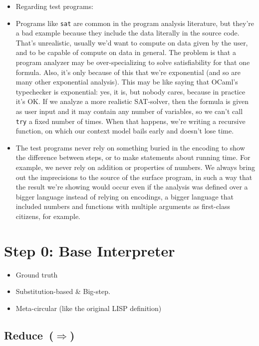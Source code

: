 \documentclass[12pt, oneside]{book}
\begin{document}
\begin{itemize}
  \item Regarding test programs:
  \item Programs like \texttt{sat} are common in the program analysis literature, but they’re a bad example because they include the data literally in the source code. That’s unrealistic, usually we’d want to compute on data given by the user, and to be capable of compute on data in general. The problem is that a program analyzer may be over-specializing to solve satisfiability for that one formula. Also, it’s only because of this that we’re exponential (and so are many other exponential analysis). This may be like saying that OCaml’s typechecker is exponential: yes, it is, but nobody cares, because in practice it’s OK. If we analyze a more realistic SAT-solver, then the formula is given as user input and it may contain any number of variables, so we can’t call \texttt{try} a fixed number of times. When that happens, we’re writing a recursive function, on which our context model bails early and doesn’t lose time.
  \item The test programs never rely on something buried in the encoding to show the difference between steps, or to make statements about running time. For example, we never rely on addition or properties of numbers. We always bring out the imprecisions to the source of the surface program, in such a way that the result we’re showing would occur even if the analysis was defined over a bigger language instead of relying on encodings, a bigger language that included numbers and functions with multiple arguments as first-class citizens, for example.
\end{itemize}

\section{Step 0: Base Interpreter}
\label{section:step-0--base-interpreter}

\begin{itemize}
  \item Ground truth
  \item Substitution-based \& Big-step.
  \item Meta-circular (like the original LISP definition)
\end{itemize}

\subsection{Reduce~(\(⇒\))}
\end{document}
